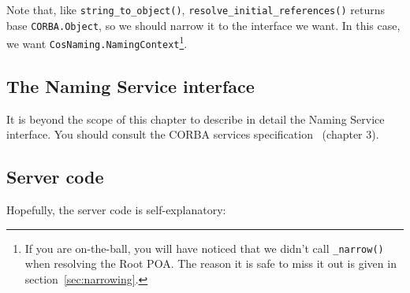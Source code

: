 \documentclass[11pt,twoside,a4paper]{book}
\newcommand{\type}[1]{\texttt{#1}}
\newcommand{\op}[1]{\texttt{#1()}}
\begin{document}
Note that, like \op{string\_to\_object},
\op{resolve\_initial\_references} returns base \type{CORBA.Object}, so
we should narrow it to the interface we want. In this case, we want
\type{CosNaming.NamingContext}\footnote{If you are on-the-ball, you
will have noticed that we didn't call \op{\_narrow} when resolving the
Root POA. The reason it is safe to miss it out is given in
section~\ref{sec:narrowing}.}.


\subsection{The Naming Service interface}

It is beyond the scope of this chapter to describe in detail the
Naming Service interface. You should consult the CORBA services
specification~\cite{corbaservices} (chapter 3).

\subsection{Server code}

Hopefully, the server code is self-explanatory:
\end{document}
